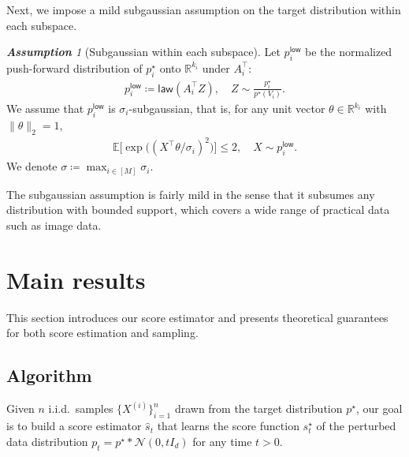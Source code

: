 \documentclass{article}
\newcommand{\defn}{\coloneqq}
\newcommand{\cN}{\mathcal{N}}
\newcommand{\low}{\mathsf{low}}
\theoremstyle{plain}
\theoremstyle{remark}
\newtheorem{assumption}{\bf Assumption}
\begin{document}
Next, we impose a mild subgaussian assumption on the target distribution within each subspace.
%
\begin{assumption}[Subgaussian within each subspace]
    \label{assump:sub-gaussian target}
    Let $p_i^\low$ be the normalized push-forward distribution of $p_i^\star$ onto $\mathbb{R}^{k_i}$ under $A_i^{\top}$: 
    \begin{align}
        p_i^\low \defn \mathsf{law}(A_i^{\top}Z), \quad Z \sim \frac{p_i^\star}{p^\star(V_i)}. \label{eq:dist in each low-dim}
    \end{align}
    We assume that $p_i^\low$ is $\sigma_i$-subgaussian, that is, for any unit vector $\theta \in \mathbb{R}^{k_i}$ with $\|\theta\|_2 = 1$,
    \begin{align*}
        \mathbb{E} \bigl[\exp\bigl( (X^{\top}\theta/\sigma_i)^2\bigr)\bigr] \leq 2, \quad X \sim p_i^\low.
    \end{align*}
    We denote $\sigma \defn \max_{i\in [M]} \sigma_i$.
\end{assumption}

The subgaussian assumption is fairly mild in the sense that it subsumes any distribution with bounded support, which covers a wide range of practical data such as image data. 



\section{Main results}
\label{sec:theoretical results}
This section introduces our score estimator and presents theoretical guarantees for both score estimation and sampling.

\subsection{Algorithm}
Given $n$ i.i.d.\ samples $\{ X^{(i)}\}_{i=1}^n$ drawn from the target distribution $p^\star$, our goal is to build a score estimator $\widehat{s}_t$ that learns the score function $s_t^\star$ of the perturbed data distribution  $p_t = p^\star \ast \cN(0,tI_d)$ for any time $t>0$.
\end{document}
